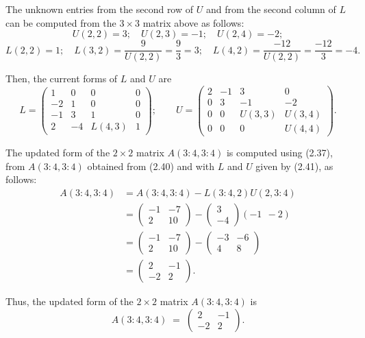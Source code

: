 \begin{examplex}
The unknown entries from the second row of $U$ and from the second column of
$L$ can be computed from the $3\times 3$ matrix above as follows:
\[
U(2,2)=3; \quad U(2,3)=-1; \quad U(2,4)=-2;
\]
\[
L(2,2)=1; \quad L(3,2)=\frac{9}{U(2,2)}=\frac{9}{3}=3; \quad L(4,2)=\frac{-12}{U(2,2)}=\frac{-12}{3}=-4.
\]

Then, the current forms of $L$ and $U$ are
\begin{equation}
L=\begin{pmatrix} 1 & 0 & 0 & 0 \\ -2 & 1 & 0 & 0 \\ -1 & 3 & 1 & 0 \\ 2 & -4 & L(4,3) & 1 \end{pmatrix};
\qquad
U=\begin{pmatrix} 2 & -1 & 3 & 0 \\ 0 & 3 & -1 & -2 \\ 0 & 0 & U(3,3) & U(3,4) \\ 0 & 0 & 0 & U(4,4) \end{pmatrix}.
\end{equation}

The updated form of the $2\times 2$ matrix $A(3:4,3:4)$ is computed using
(2.37), from $A(3:4,3:4)$ obtained from (2.40) and with $L$ and $U$ given by
(2.41), as follows:
\begin{align*}
A(3:4,3:4) &= A(3:4,3:4) - L(3:4,2)U(2,3:4) \\
&= \begin{pmatrix} -1 & -7 \\ 2 & 10 \end{pmatrix} - \begin{pmatrix} 3 \\ -4 \end{pmatrix}(-1\ \ -2) \\
&= \begin{pmatrix} -1 & -7 \\ 2 & 10 \end{pmatrix} - \begin{pmatrix} -3 & -6 \\ 4 & 8 \end{pmatrix} \\
&= \begin{pmatrix} 2 & -1 \\ -2 & 2 \end{pmatrix}.
\end{align*}

Thus, the updated form of the $2\times 2$ matrix $A(3:4,3:4)$ is
\begin{equation}
A(3:4,3:4) \;=\; \begin{pmatrix} 2 & -1 \\ -2 & 2 \end{pmatrix}.
\end{equation}


\end{examplex}

